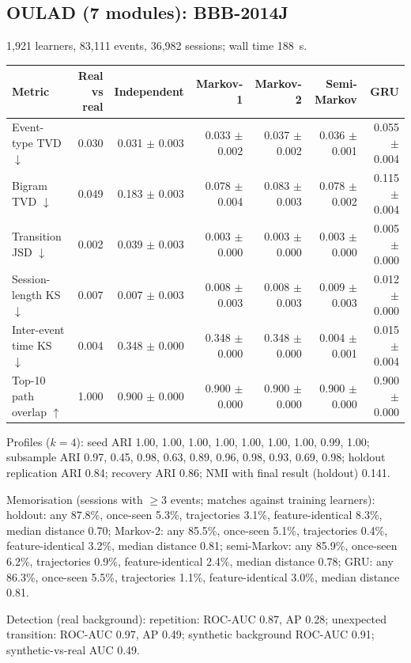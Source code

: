 \subsection*{OULAD (7 modules): BBB-2014J}
1{,}921 learners, 83{,}111 events, 36{,}982 sessions; wall time 188~s.

\begin{tabular}{l r r r r r r }
\toprule
Metric & Real vs real & Independent & Markov-1 & Markov-2 & Semi-Markov & GRU \\
\midrule
Event-type TVD $\downarrow$ & 0.030 & 0.031 $\pm$ 0.003 & 0.033 $\pm$ 0.002 & 0.037 $\pm$ 0.002 & 0.036 $\pm$ 0.001 & 0.055 $\pm$ 0.004 \\
Bigram TVD $\downarrow$ & 0.049 & 0.183 $\pm$ 0.003 & 0.078 $\pm$ 0.004 & 0.083 $\pm$ 0.003 & 0.078 $\pm$ 0.002 & 0.115 $\pm$ 0.004 \\
Transition JSD $\downarrow$ & 0.002 & 0.039 $\pm$ 0.003 & 0.003 $\pm$ 0.000 & 0.003 $\pm$ 0.000 & 0.003 $\pm$ 0.000 & 0.005 $\pm$ 0.000 \\
Session-length KS $\downarrow$ & 0.007 & 0.007 $\pm$ 0.003 & 0.008 $\pm$ 0.003 & 0.008 $\pm$ 0.003 & 0.009 $\pm$ 0.003 & 0.012 $\pm$ 0.000 \\
Inter-event time KS $\downarrow$ & 0.004 & 0.348 $\pm$ 0.000 & 0.348 $\pm$ 0.000 & 0.348 $\pm$ 0.000 & 0.004 $\pm$ 0.001 & 0.015 $\pm$ 0.004 \\
Top-10 path overlap $\uparrow$ & 1.000 & 0.900 $\pm$ 0.000 & 0.900 $\pm$ 0.000 & 0.900 $\pm$ 0.000 & 0.900 $\pm$ 0.000 & 0.900 $\pm$ 0.000 \\
\bottomrule
\end{tabular}

Profiles ($k=4$): seed ARI 1.00, 1.00, 1.00, 1.00, 1.00, 1.00, 1.00, 0.99, 1.00; subsample ARI 0.97, 0.45, 0.98, 0.63, 0.89, 0.96, 0.98, 0.93, 0.69, 0.98; holdout replication ARI 0.84; recovery ARI 0.86; NMI with final result (holdout) 0.141.

Memorisation (sessions with $\geq$3 events; matches against training learners): holdout: any 87.8\%, once-seen 5.3\%, trajectories 3.1\%, feature-identical 8.3\%, median distance 0.70; Markov-2: any 85.5\%, once-seen 5.1\%, trajectories 0.4\%, feature-identical 3.2\%, median distance 0.81; semi-Markov: any 85.9\%, once-seen 6.2\%, trajectories 0.9\%, feature-identical 2.4\%, median distance 0.78; GRU: any 86.3\%, once-seen 5.5\%, trajectories 1.1\%, feature-identical 3.0\%, median distance 0.81.

Detection (real background): repetition: ROC-AUC 0.87, AP 0.28; unexpected transition: ROC-AUC 0.97, AP 0.49; synthetic background ROC-AUC 0.91; synthetic-vs-real AUC 0.49.

